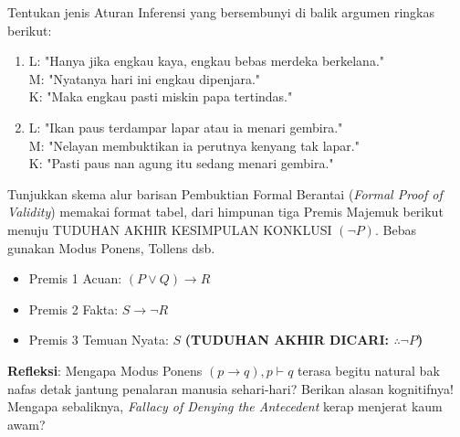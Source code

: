 \documentclass[../main]{subfiles}
\begin{document}
\begin{latihan}
  \item Tentukan jenis Aturan Inferensi yang bersembunyi di balik argumen ringkas berikut:
  \begin{enumerate}
    \item L: "Hanya jika engkau kaya, engkau bebas merdeka berkelana." \\
          M: "Nyatanya hari ini engkau dipenjara." \\
          K: "Maka engkau pasti miskin papa tertindas."
    \item L: "Ikan paus terdampar lapar atau ia menari gembira." \\
          M: "Nelayan membuktikan ia perutnya kenyang tak lapar." \\
          K: "Pasti paus nan agung itu sedang menari gembira."
  \end{enumerate}
  \item Tunjukkan skema alur barisan Pembuktian Formal Berantai (\textit{Formal Proof of Validity}) memakai format tabel, dari himpunan tiga Premis Majemuk berikut menuju TUDUHAN AKHIR KESIMPULAN KONKLUSI $(\neg P)$. Bebas gunakan Modus Ponens, Tollens dsb.
  \begin{itemize}
      \item Premis 1 Acuan: $(P \lor Q) \rightarrow R$
      \item Premis 2 Fakta: $S \rightarrow \neg R$
      \item Premis 3 Temuan Nyata: $S$ \;\;\textbf{(TUDUHAN AKHIR DICARI: $\therefore \neg P$)}
  \end{itemize}
  \item \textbf{Refleksi}: Mengapa Modus Ponens $(p \rightarrow q), p \vdash q$ terasa begitu natural bak nafas detak jantung penalaran manusia sehari-hari? Berikan alasan kognitifnya! Mengapa sebaliknya, \textit{Fallacy of Denying the Antecedent} kerap menjerat kaum awam?
\end{latihan}

\end{document}
